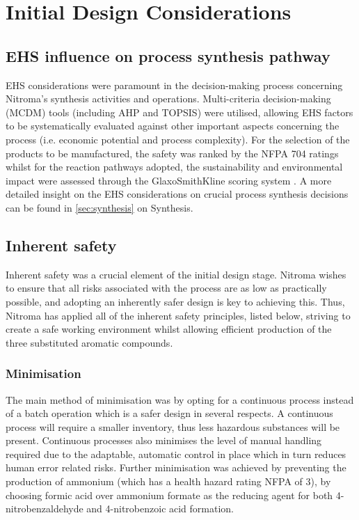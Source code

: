  
\section{Initial Design Considerations}

\subsection{EHS influence on process synthesis pathway}

EHS considerations were paramount in the decision-making process concerning Nitroma’s synthesis activities and operations. Multi-criteria decision-making (MCDM) tools (including AHP and TOPSIS) were utilised, allowing EHS factors to be systematically evaluated against other important aspects concerning the process (i.e. economic potential and process complexity). For the selection of the products to be manufactured, the safety was ranked by the NFPA 704 ratings whilst for the reaction pathways adopted, the sustainability and environmental impact were assessed through the GlaxoSmithKline scoring system \cite{henderson_expanding_2011}. A more detailed insight on the EHS considerations on crucial process synthesis decisions can be found in \cref{sec:synthesis} on Synthesis. 

\subsection{Inherent safety}
\label{sec:inherentsafety}

Inherent safety was a crucial element of the initial design stage. Nitroma wishes to ensure that all risks associated with the process are as low as practically possible, and adopting an inherently safer design is key to achieving this. Thus, Nitroma has applied all of the inherent safety principles, listed below, striving to create a safe working environment whilst allowing efficient production of the three substituted aromatic compounds. 

\subsubsection{Minimisation}
The main method of minimisation was by opting for a continuous process instead of a batch operation which is a safer design in several respects. A continuous process will require a smaller inventory, thus less hazardous substances will be present. Continuous processes also minimises the level of manual handling required due to the adaptable, automatic control in place which in turn reduces human error related risks. 
Further minimisation was achieved by preventing the production of ammonium (which has a health hazard rating NFPA of 3), by choosing formic acid over ammonium formate as the reducing agent for both 4-nitrobenzaldehyde and 4-nitrobenzoic acid formation.  

